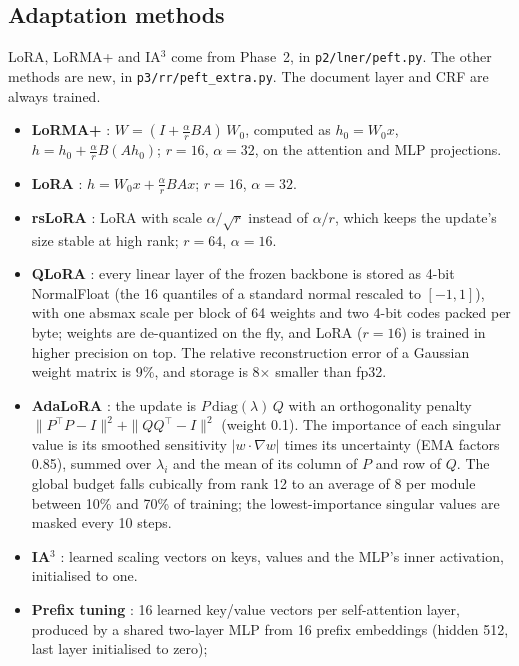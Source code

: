 \documentclass[11pt,a4paper]{article}
\newcommand{\code}[1]{\texttt{\small #1}}
\begin{document}
\subsection{Adaptation methods}\label{sec:peft}
LoRA, LoRMA+ and IA$^3$ come from Phase~2, in \code{p2/lner/peft.py}.  The other methods are new, in
\code{p3/rr/peft\_extra.py}.  The document layer and CRF are always trained.
\begin{itemize}
  \item \textbf{LoRMA+} \cite{bihany2025lorma}: $W = (I + \frac{\alpha}{r}BA)\,W_0$, computed as
  $h_0=W_0x$, $h=h_0+\frac{\alpha}{r}B(Ah_0)$; $r=16$, $\alpha=32$, on the attention and MLP projections.
  \item \textbf{LoRA} \cite{hu2022lora}: $h = W_0x + \frac{\alpha}{r}BAx$; $r=16$, $\alpha=32$.
  \item \textbf{rsLoRA} \cite{kalajdzievski2023rslora}: LoRA with scale $\alpha/\sqrt{r}$ instead of
  $\alpha/r$, which keeps the update's size stable at high rank; $r=64$, $\alpha=16$.
  \item \textbf{QLoRA} \cite{dettmers2023qlora}: every linear layer of the frozen backbone is stored as 4-bit
  NormalFloat (the 16 quantiles of a standard normal rescaled to $[-1,1]$), with one absmax scale per block of
  64 weights and two 4-bit codes packed per byte; weights are de-quantized on the fly, and LoRA ($r=16$) is
  trained in higher precision on top.  The relative reconstruction error of a Gaussian weight matrix is 9\%,
  and storage is 8$\times$ smaller than fp32.
  \item \textbf{AdaLoRA} \cite{zhang2023adalora}: the update is $P\,\mathrm{diag}(\lambda)\,Q$ with an
  orthogonality penalty $\|P^\top P-I\|^2+\|QQ^\top-I\|^2$ (weight 0.1).  The importance of each singular value
  is its smoothed sensitivity $|w\cdot\nabla w|$ times its uncertainty (EMA factors 0.85), summed over
  $\lambda_i$ and the mean of its column of $P$ and row of $Q$.  The global budget falls cubically from rank 12
  to an average of 8 per module between 10\% and 70\% of training; the lowest-importance singular values are
  masked every 10 steps.
  \item \textbf{IA$^3$} \cite{liu2022ia3}: learned scaling vectors on keys, values and the MLP's inner
  activation, initialised to one.
  \item \textbf{Prefix tuning} \cite{li2021prefix}: 16 learned key/value vectors per self-attention layer,
  produced by a shared two-layer MLP from 16 prefix embeddings (hidden 512, last layer initialised to zero);

\end{itemize}
\end{document}
